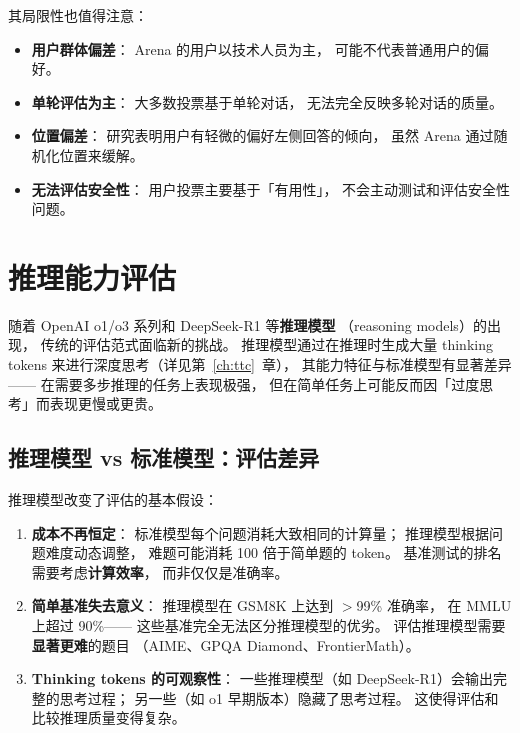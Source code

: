 其局限性也值得注意：
\begin{itemize}[noitemsep]
  \item \textbf{用户群体偏差}：
        Arena 的用户以技术人员为主，
        可能不代表普通用户的偏好。
  \item \textbf{单轮评估为主}：
        大多数投票基于单轮对话，
        无法完全反映多轮对话的质量。
  \item \textbf{位置偏差}：
        研究表明用户有轻微的偏好左侧回答的倾向，
        虽然 Arena 通过随机化位置来缓解。
  \item \textbf{无法评估安全性}：
        用户投票主要基于「有用性」，
        不会主动测试和评估安全性问题。
\end{itemize}

\section{推理能力评估}
\label{sec:reasoning-eval}

随着 OpenAI o1/o3 系列和 DeepSeek-R1 等\textbf{推理模型}
（reasoning models）的出现，
传统的评估范式面临新的挑战。
推理模型通过在推理时生成大量 thinking tokens
来进行深度思考（详见第~\ref{ch:ttc}~章），
其能力特征与标准模型有显著差异——
在需要多步推理的任务上表现极强，
但在简单任务上可能反而因「过度思考」而表现更慢或更贵。

\subsection{推理模型 vs 标准模型：评估差异}

\begin{corebox}[推理模型的独特评估挑战]
推理模型改变了评估的基本假设：
\begin{enumerate}[noitemsep]
  \item \textbf{成本不再恒定}：
        标准模型每个问题消耗大致相同的计算量；
        推理模型根据问题难度动态调整，
        难题可能消耗 100 倍于简单题的 token。
        基准测试的排名需要考虑\textbf{计算效率}，
        而非仅仅是准确率。
  \item \textbf{简单基准失去意义}：
        推理模型在 GSM8K 上达到 $>$99\% 准确率，
        在 MMLU 上超过 90\%——
        这些基准完全无法区分推理模型的优劣。
        评估推理模型需要\textbf{显著更难}的题目
        （AIME、GPQA Diamond、FrontierMath）。
  \item \textbf{Thinking tokens 的可观察性}：
        一些推理模型（如 DeepSeek-R1）会输出完整的思考过程；
        另一些（如 o1 早期版本）隐藏了思考过程。
        这使得评估和比较推理质量变得复杂。
\end{enumerate}
\end{corebox}

